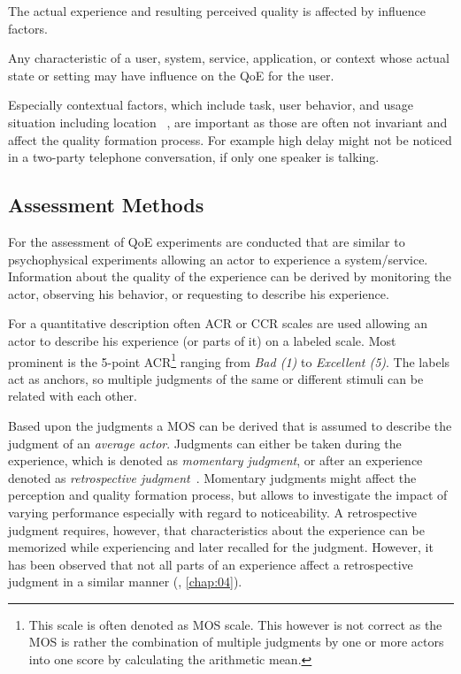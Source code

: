 The actual experience and resulting perceived quality is affected by influence factors.
\begin{definition}
Any characteristic of a user, system, service, application, or context whose actual state or setting may have influence on the \ac{QoE} for the user.~\citep[][p. 56]{reiter_quality_2014}
\end{definition}
Especially contextual factors, which include task, user behavior, and usage situation including location ~\citep[\cf,][p. 56]{reiter_quality_2014}, are important as those are often not invariant and affect the quality formation process.
For example high delay might not be noticed in a two-party telephone conversation, if only one speaker is talking.

\subsection{Assessment Methods}
For the assessment of \ac{QoE} experiments are conducted that are similar to psychophysical experiments allowing an actor to experience a system/service.
Information about the quality of the experience can be derived by monitoring the actor, observing his behavior, or requesting to describe his experience.

For a quantitative description often \ac{ACR} or \ac{CCR} scales are used allowing an actor to describe his experience (or parts of it) on a labeled scale.
Most prominent is the 5-point \ac{ACR}\footnote{This scale is often denoted as \ac{MOS} scale. This however is not correct as the \ac{MOS} is rather the combination of multiple judgments by one or more actors into one score by calculating the arithmetic mean.} ranging from \emph{Bad (1)} to \emph{Excellent (5)}.
The labels act as anchors, so multiple judgments of the same or different stimuli can be related with each other.

Based upon the judgments a \ac{MOS} can be derived that is assumed to describe the judgment of an \emph{average actor}.
Judgments can either be taken during the experience, which is denoted as \emph{momentary judgment}, or after an experience denoted as \emph{retrospective judgment}~\citep[\cf,][]{weiss_temporal_2014}.
Momentary judgments might affect the perception and quality formation process, but allows to investigate the impact of varying performance especially with regard to noticeability.
A retrospective judgment requires, however, that characteristics about the experience can be memorized while experiencing and later recalled for the judgment.
However, it has been observed that not all parts of an experience affect a retrospective judgment in a similar manner (\cf, \autoref{chap:04}).

